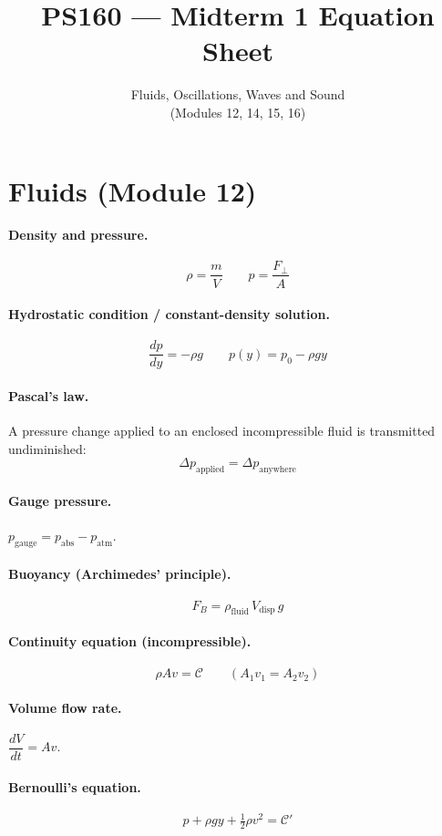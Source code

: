 \documentclass[11pt]{article}
\title{PS160 --- Midterm 1 Equation Sheet}
\author{Fluids, Oscillations, Waves and Sound \\ (Modules 12, 14, 15, 16)}
\date{}
\begin{document}
\maketitle

\section*{Fluids (Module 12)}

\paragraph{Density and pressure.}
\[
\rho = \frac{m}{V}
\qquad
p = \frac{F_\perp}{A}
\]

\paragraph{Hydrostatic condition / constant-density solution.}
\[
\frac{dp}{dy} = -\rho g
\qquad
p(y) = p_0 - \rho g y
\]

\paragraph{Pascal's law.} A pressure change applied to an enclosed incompressible fluid is transmitted undiminished:
\[
\Delta p_{\text{applied}} = \Delta p_{\text{anywhere}}
\]

\paragraph{Gauge pressure.} $p_{\text{gauge}} = p_{\text{abs}} - p_{\text{atm}}$.

\paragraph{Buoyancy (Archimedes' principle).}
\[
F_B = \rho_{\text{fluid}}\, V_{\text{disp}}\, g
\]

\paragraph{Continuity equation (incompressible).}
\[
\rho A v = \mathcal{C}
\qquad (A_1 v_1 = A_2 v_2)
\]

\paragraph{Volume flow rate.} $\dfrac{dV}{dt} = A v$.

\paragraph{Bernoulli's equation.}
\[
p + \rho g y + \tfrac{1}{2}\rho v^{2} = \mathcal{C}'
\]
\end{document}
